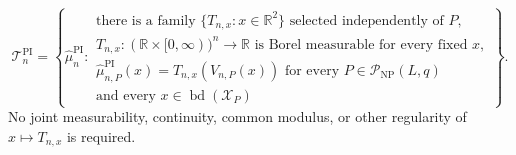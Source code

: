 \[
 \mathcal T_n^{\mathrm{PI}}
 =\left\{\widehat\mu_n^{\mathrm{PI}}:\begin{array}{l}
 \text{there is a family }\{T_{n,x}:x\in\mathbb R^2\}\text{ selected independently of }P,\\
 T_{n,x}:(\mathbb R\times[0,\infty))^n\to\mathbb R
 \text{ is Borel measurable for every fixed }x,\\
 \widehat\mu_{n,P}^{\mathrm{PI}}(x)=T_{n,x}(V_{n,P}(x))
 \text{ for every }P\in\mathcal P_{\mathrm{NP}}(L,q)\\
 \text{and every }x\in\operatorname{bd}(\mathcal X_P)
 \end{array}\right\}.
\]
No joint measurability, continuity, common modulus, or other regularity of \(x\mapsto T_{n,x}\) is required.